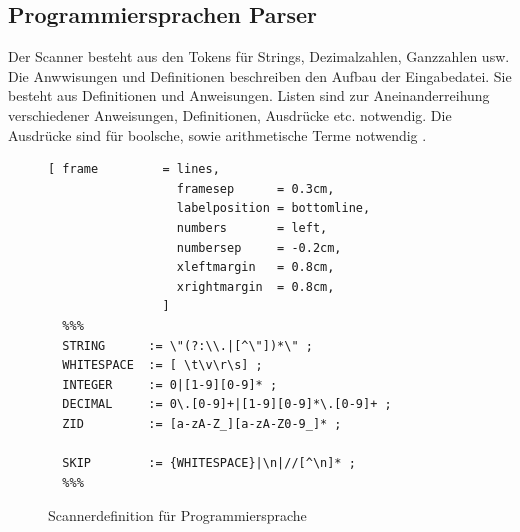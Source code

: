 \subsection{Programmiersprachen Parser}
Der Scanner  besteht aus den Tokens für Strings, Dezimalzahlen, Ganzzahlen usw.
Die Anwwisungen und Definitionen  beschreiben den Aufbau der Eingabedatei. Sie besteht aus Definitionen und Anweisungen.
Listen  sind zur Aneinanderreihung verschiedener Anweisungen, Definitionen, Ausdrücke etc. notwendig. 
Die Ausdrücke sind für boolsche, sowie arithmetische Terme notwendig .
%
\begin{figure}[!ht]

\begin{Verbatim}[ frame         = lines, 
                  framesep      = 0.3cm, 
                  labelposition = bottomline,
                  numbers       = left,
                  numbersep     = -0.2cm,
                  xleftmargin   = 0.8cm,
                  xrightmargin  = 0.8cm,
                ]
  %%%
  STRING      := \"(?:\\.|[^\"])*\" ;
  WHITESPACE  := [ \t\v\r\s] ;
  INTEGER     := 0|[1-9][0-9]* ;
  DECIMAL     := 0\.[0-9]+|[1-9][0-9]*\.[0-9]+ ;
  ZID         := [a-zA-Z_][a-zA-Z0-9_]* ;

  SKIP        := {WHITESPACE}|\n|//[^\n]* ;
  %%%
\end{Verbatim}
\caption{Scannerdefinition für Programmiersprache}
\label{fig:example_interpreter_grammar_scanner}
\end{figure}
